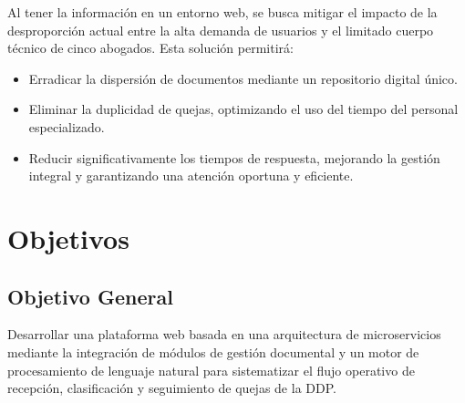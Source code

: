 Al tener la información en un entorno web, se busca mitigar el impacto de la desproporción actual entre la alta demanda de usuarios y el limitado cuerpo técnico de cinco abogados. Esta solución permitirá:

\begin{itemize}
\item Erradicar la dispersión de documentos mediante un repositorio digital único.
\item Eliminar la duplicidad de quejas, optimizando el uso del tiempo del personal especializado.
\item Reducir significativamente los tiempos de respuesta, mejorando la gestión integral y garantizando una atención oportuna y eficiente.
\end{itemize}


\section{Objetivos}

\subsection{Objetivo General}
Desarrollar una plataforma web basada en una arquitectura de microservicios mediante la integración de módulos de gestión documental y un motor de procesamiento de lenguaje natural para sistematizar el flujo operativo de recepción, clasificación y seguimiento de quejas de la DDP.

